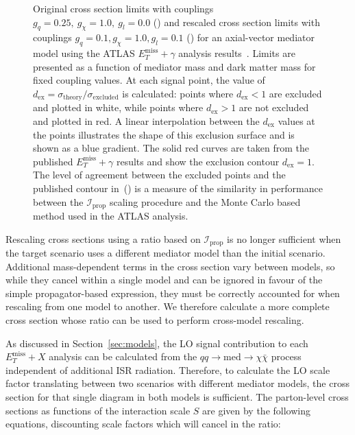 \documentclass[a4paper, 11pt]{article}
\newcommand{\MET}{\ensuremath{E_T^\mathrm{miss}}\xspace}
\newcommand{\met}{\MET}
\newcommand{\metplusx}{\ensuremath{\MET+X}\xspace}
\begin{document}
\begin{figure}[htp!]
\begin{center}
  \caption{Original cross section limits with couplings $g_q=0.25,~g_\chi=1.0,~g_l = 0.0$ () and rescaled cross section limits with couplings $g_q=0.1, g_\chi=1.0, g_l = 0.1$ () for an axial-vector mediator model using the ATLAS $\met+\gamma$ analysis results~\cite{monophoton}. Limits are presented as a function of mediator mass and dark matter mass for fixed coupling values. At each signal point, the value of $d_\text{ex} = \sigma_{\text{theory}}/\sigma_{\text{excluded}}$ is calculated: points where $d_\text{ex}<1$ are excluded and plotted in white, while points where $d_\text{ex}>1$ are not excluded and plotted in red. A linear interpolation between the $d_\text{ex}$ values at the points illustrates the shape of this exclusion surface and is shown as a blue gradient. The solid red curves are taken from the published $\met+\gamma$ results and show the exclusion contour $d_\text{ex} = 1$. The level of agreement between the excluded points and the published contour in~() is a measure of the similarity in performance between the $\mathcal{I}_{\text{prop}}$ scaling procedure and the Monte Carlo based method used in the ATLAS analysis.}
  \label{fig:propagator_scaling}
  \end{center}
\end{figure}

Rescaling cross sections using a ratio based on $\mathcal{I}_{\text{prop}}$ is no longer sufficient when the target scenario uses a different mediator model than the initial scenario. Additional mass-dependent terms in the cross section vary between models, so while they cancel within a single model and can be ignored in favour of the simple propagator-based expression, they must be correctly accounted for when rescaling from one model to another. We therefore calculate a more complete cross section whose ratio can be used to perform cross-model rescaling.

As discussed in Section~\ref{sec:models}, the LO signal contribution to each \metplusx analysis can be calculated from the $qq\rightarrow \text{med} \rightarrow \chi \bar{\chi}$ process independent of additional ISR radiation. Therefore, to calculate the LO scale factor translating between two scenarios with different mediator models, the cross section for that single diagram in both models is sufficient. The parton-level cross sections as functions of the interaction scale $S$ are given by the following equations, discounting scale factors which will cancel in the ratio:
\end{document}
